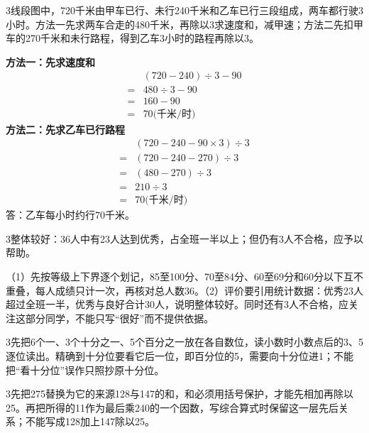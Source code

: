 \documentclass[multi=snippet,border={5bp 20bp 5bp 5bp}]{standalone}
\newenvironment{snippet}[3]{\begin{minipage}{#1bp}\color{answerred}\fontsize{#2}{#3}\selectfont\raggedright}{\end{minipage}}
\begin{document}
\begin{snippet}{505}{11.5}{14}\begin{multicols}{3}\raggedcolumns 线段图中，720千米由甲车已行、未行240千米和乙车已行三段组成，两车都行驶3小时。方法一先求两车合走的480千米，再除以3求速度和，减甲速；方法二先扣甲车的270千米和未行路程，得到乙车3小时的路程再除以3。\par \textbf{方法一：先求速度和}\[\begin{aligned} &(720-240)\div3-90\\={}&480\div3-90\\={}&160-90\\={}&70\text{(千米/时)}\end{aligned}\]\textbf{方法二：先求乙车已行路程}\[\begin{aligned} &(720-240-90\times3)\div3\\={}&(720-240-270)\div3\\={}&(480-270)\div3\\={}&210\div3\\={}&70\text{(千米/时)}\end{aligned}\]答：乙车每小时约行70千米。\end{multicols}\end{snippet}
\begin{snippet}{505}{11.5}{14}\begin{multicols}{3}\raggedcolumns 整体较好：36人中有23人达到优秀，占全班一半以上；但仍有3人不合格，应予以帮助。\par （1）先按等级上下界逐个划记，85至100分、70至84分、60至69分和60分以下互不重叠，每人成绩只计一次，再核对总人数36。（2）评价要引用统计数据：优秀23人超过全班一半，优秀与良好合计30人，说明整体较好。同时还有3人不合格，应关注这部分同学，不能只写“很好”而不提供依据。\end{multicols}\end{snippet}
\begin{snippet}{505}{11.5}{14}\begin{multicols}{3}\raggedcolumns 先把6个一、3个十分之一、5个百分之一放在各自数位，读小数时小数点后的3、5逐位读出。精确到十分位要看它后一位，即百分位的5，需要向十分位进1；不能把“看十分位”误作只照抄原十分位。\end{multicols}\end{snippet}
\begin{snippet}{505}{11.5}{14}\begin{multicols}{3}\raggedcolumns 先把275替换为它的来源128与147的和，和必须用括号保护，才能先相加再除以25。再把所得的11作为最后乘240的一个因数，写综合算式时保留这一层先后关系；不能写成128加上147除以25。\end{multicols}\end{snippet}
\end{document}
